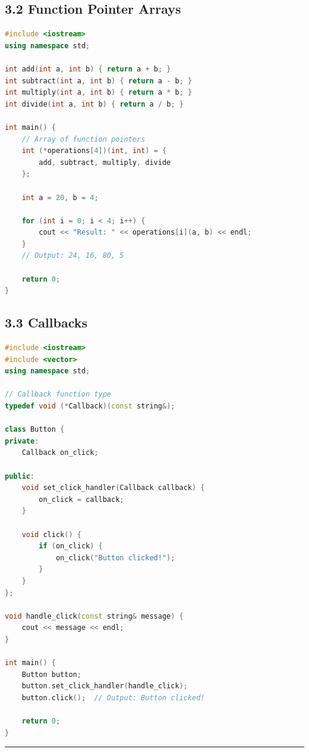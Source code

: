\hypertarget{function-pointer-arrays}{%
\subsection{3.2 Function Pointer Arrays}\label{function-pointer-arrays}}

\begin{lstlisting}[language={C++}]
#include <iostream>
using namespace std;

int add(int a, int b) { return a + b; }
int subtract(int a, int b) { return a - b; }
int multiply(int a, int b) { return a * b; }
int divide(int a, int b) { return a / b; }

int main() {
    // Array of function pointers
    int (*operations[4])(int, int) = {
        add, subtract, multiply, divide
    };

    int a = 20, b = 4;

    for (int i = 0; i < 4; i++) {
        cout << "Result: " << operations[i](a, b) << endl;
    }
    // Output: 24, 16, 80, 5

    return 0;
}
\end{lstlisting}

\hypertarget{callbacks}{%
\subsection{3.3 Callbacks}\label{callbacks}}

\begin{lstlisting}[language={C++}]
#include <iostream>
#include <vector>
using namespace std;

// Callback function type
typedef void (*Callback)(const string&);

class Button {
private:
    Callback on_click;

public:
    void set_click_handler(Callback callback) {
        on_click = callback;
    }

    void click() {
        if (on_click) {
            on_click("Button clicked!");
        }
    }
};

void handle_click(const string& message) {
    cout << message << endl;
}

int main() {
    Button button;
    button.set_click_handler(handle_click);
    button.click();  // Output: Button clicked!

    return 0;
}
\end{lstlisting}

\begin{center}\rule{0.5\linewidth}{0.5pt}\end{center}


